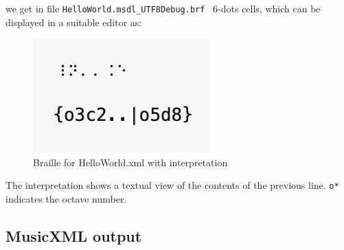 we get in file {\tt HelloWorld.msdl_UTF8Debug.brf} \braille\ 6-dots cells, which can be displayed in a suitable editor as:
\begin{figure}[htbp]
\begin{center}
\includegraphics{../graphics/BrailleForHelloWorld.xmlWithInterpretation.png}

\caption{Braille for HelloWorld.xml with interpretation}
\label{Braille for HelloWorld.xml with interpretation}
\end{center}
\end{figure}

The interpretation shows a textual view of the contents of the previous line. {\tt o*} indicates the octave number.

\subsection{MusicXML output}

